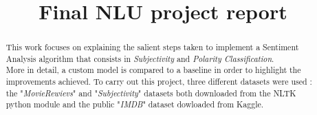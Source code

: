 \documentclass[a4paper]{article}
\title{Final NLU project report}
\begin{document}
\maketitle

\begin{abstract}
    This work focuses on explaining the salient steps taken to implement a Sentiment Analysis algorithm that consists in \textit{Subjectivity} and \textit{Polarity Classification}.\\
    More in detail, a custom model is compared to a baseline in order to highlight the improvements achieved. To carry out this project, three different datasets were used : 
    the "\textit{MovieRewievs}" and  "\textit{Subjectivity}" datasets both downloaded from the NLTK python module and the public "\textit{IMDB}" dataset dowloaded from Kaggle\cite{kaggle}.\\
\end{abstract}






\end{document}
